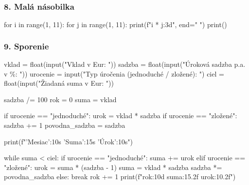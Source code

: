 \subsubsection*{8. Malá násobilka}
\begin{solution}
for i in range(1, 11):
    for j in range(1, 11):
        print(f"{i * j:3d}", end=" ")
    print()
\end{solution}


\subsubsection*{9. Sporenie}
\begin{solution}
vklad = float(input("Vklad v Eur: "))
sadzba = float(input("Úroková sadzba p.a. v \%: "))
urocenie = input("Typ úročenia (jednoduché / zložené): ")
ciel = float(input("Žiadaná suma v Eur: "))

sadzba /= 100
rok = 0
suma = vklad

if urocenie == "jednoduché":
    urok = vklad * sadzba
if urocenie == "zložené":
    sadzba += 1
    povodna_sadzba = sadzba

print(f"{'Mesiac':10s} {'Suma':15s} {'Úrok':10s}")

while suma < ciel:
    if urocenie == "jednoduché":
        suma += urok
    elif urocenie == "zložené":
        urok = suma * (sadzba - 1)
        suma = vklad * sadzba
        sadzba *= povodna_sadzba
    else:
        break
    rok += 1
    print(f"{rok:10d} {suma:15.2f} {urok:10.2f}")
\end{solution}
